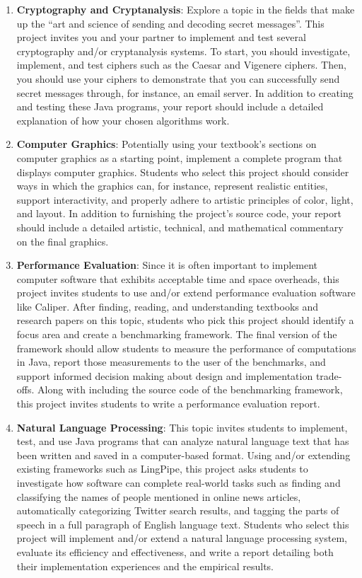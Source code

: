 \begin{enumerate}

  \item {\bf Cryptography and Cryptanalysis}: Explore a topic in the fields that make up the ``art and science of
    sending and decoding secret messages''. This project invites you and your partner to implement and test several cryptography
    and/or cryptanalysis systems.  To start, you should investigate, implement, and test ciphers such as the Caesar and
    Vigenere ciphers. Then, you should use your ciphers to demonstrate that you can successfully send secret messages
    through, for instance, an email server. In addition to creating and testing these Java programs, your report should
    include a detailed explanation of how your chosen algorithms work.

  \item {\bf Computer Graphics}: Potentially using your textbook's sections on computer graphics as a starting point,
    implement a complete program that displays computer graphics.  Students who select this project should consider ways
    in which the graphics can, for instance, represent realistic entities, support interactivity, and properly adhere to
    artistic principles of color, light, and layout. In addition to furnishing the project's source code, your report
    should include a detailed artistic, technical, and mathematical commentary on the final graphics.

  \item {\bf Performance Evaluation}: Since it is often important to implement computer software that exhibits
    acceptable time and space overheads, this project invites students to use and/or extend performance evaluation
    software like Caliper.  After finding, reading, and understanding textbooks and research papers on this topic,
    students who pick this project should identify a focus area and create a benchmarking framework.  The
    final version of the framework should allow students to measure the performance of computations in Java, report
    those measurements to the user of the benchmarks, and support informed decision making about design and
    implementation trade-offs.  Along with including the source code of the benchmarking framework, this
    project invites students to write a performance evaluation report.

  \item {\bf Natural Language Processing}: This topic invites students to implement, test, and use Java programs that
    can analyze natural language text that has been written and saved in a computer-based format.  Using and/or
    extending existing frameworks such as LingPipe, this project asks students to investigate how software can complete
    real-world tasks such as finding and classifying the names of people mentioned in online news articles,
    automatically categorizing Twitter search results, and tagging the parts of speech in a full paragraph of English
    language text. Students who select this project will implement and/or extend a natural language processing system,
    evaluate its efficiency and effectiveness, and write a report detailing both their implementation experiences and
    the empirical results.


\end{enumerate}

